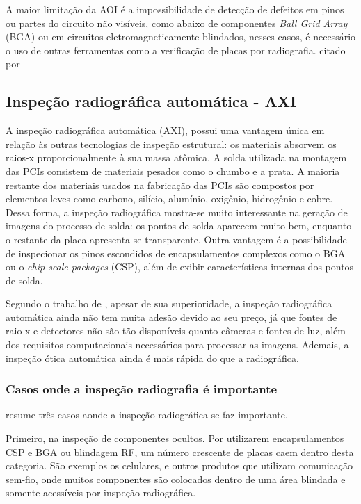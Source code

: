 A maior limitação da AOI é a impossibilidade de detecção de defeitos em pinos ou partes do circuito não visíveis, como abaixo de componentes \textit{Ball Grid Array} (BGA) ou em circuitos eletromagneticamente blindados, nesses casos, é necessário o uso de outras ferramentas como a verificação de placas por radiografia.
\cite{savage1993automated} citado por \citep{mello2015sistema}
\subsection{Inspeção radiográfica automática - AXI}

A inspeção radiográfica automática (AXI), possui uma vantagem única em relação às outras tecnologias de inspeção estrutural: os materiais absorvem os raios-x proporcionalmente à sua massa atômica. A solda utilizada na montagem das PCIs consistem de materiais pesados como o chumbo e a prata. A maioria restante dos materiais usados na fabricação das PCIs são compostos por elementos leves como carbono, silício, alumínio, oxigênio, hidrogênio e cobre. Dessa forma, a inspeção radiográfica mostra-se muito interessante na geração de imagens do processo de solda: os pontos de solda aparecem muito bem, enquanto o restante da placa apresenta-se transparente. Outra vantagem é a possibilidade de inspecionar os pinos escondidos de encapsulamentos complexos como o BGA ou o \textit{chip-scale packages} (CSP), além de exibir características internas dos pontos de solda.

Segundo o trabalho de \citet{leinbach2001and}, apesar de sua superioridade, a inspeção radiográfica automática ainda não tem muita adesão devido ao seu preço, já que fontes de raio-x e detectores não são tão disponíveis quanto câmeras e fontes de luz, além dos requisitos computacionais necessários para processar as imagens. Ademais, a inspeção ótica automática ainda é mais rápida do que a radiográfica.

\subsubsection{Casos onde a inspeção radiografia é importante}

\citet{leinbach2001and} resume três casos aonde a inspeção radiográfica se faz importante.

Primeiro, na inspeção de componentes ocultos. Por utilizarem encapsulamentos CSP e BGA ou blindagem RF, um número crescente de placas caem dentro desta categoria. São exemplos os celulares, e outros produtos que utilizam comunicação sem-fio, onde muitos componentes são colocados dentro de uma área blindada e somente acessíveis por inspeção radiográfica.

